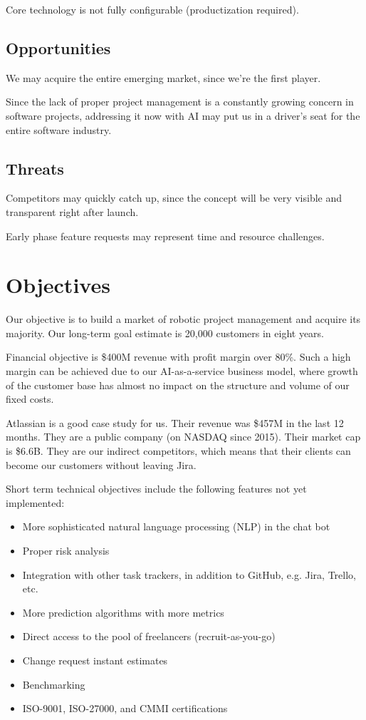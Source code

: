 \documentclass[12pt]{article}
\begin{document}
Core technology is not fully configurable (productization required).

\subsection{Opportunities}

We may acquire the entire emerging market, since we're the first player.

Since the lack of proper project management is a constantly growing concern in
software projects, addressing it now with AI may put us in a driver's seat for
the entire software industry.

\subsection{Threats}

Competitors may quickly catch up, since the concept will be very visible and
transparent right after launch.

Early phase feature requests may represent time and resource challenges.

\section{Objectives}

Our objective is to build a market of robotic project management and acquire its
majority. Our long-term goal estimate is 20,000 customers in eight years.

Financial objective is \$400M revenue with profit margin over 80\%. Such a high
margin can be achieved due to our AI-as-a-service business model, where growth
of the customer base has almost no impact on the structure and volume of our
fixed costs.

Atlassian is a good case study for us. Their revenue was \$457M in the last 12
months. They are a public company (on NASDAQ since 2015). Their market cap is
\$6.6B. They are our indirect competitors, which means that their clients can
become our customers without leaving Jira.

Short term technical objectives include the following features not yet implemented:

\begin{itemize}
  \item More sophisticated natural language processing (NLP) in the chat bot
  \item Proper risk analysis
  \item Integration with other task trackers, in addition to GitHub, e.g. Jira, Trello, etc.
  \item More prediction algorithms with more metrics
  \item Direct access to the pool of freelancers (recruit-as-you-go)
  \item Change request instant estimates
  \item Benchmarking
  \item ISO-9001, ISO-27000, and CMMI certifications
\end{itemize}
\end{document}
